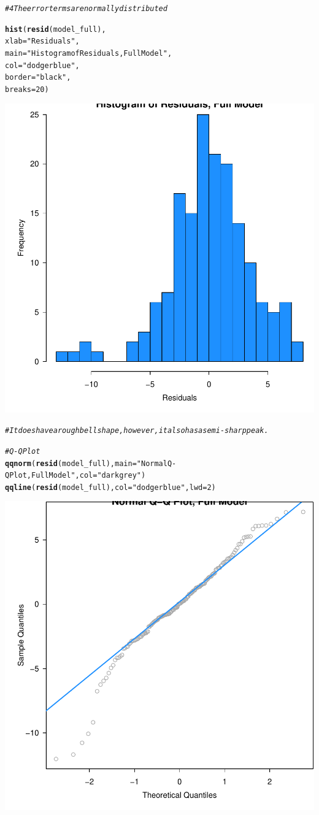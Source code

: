 \documentclass{article}\usepackage[]{graphicx}\usepackage[]{color}
\makeatletter
\newcommand{\hlnum}[1]{\textcolor[rgb]{0.686,0.059,0.569}{#1}}%
\newcommand{\hlstr}[1]{\textcolor[rgb]{0.192,0.494,0.8}{#1}}%
\newcommand{\hlcom}[1]{\textcolor[rgb]{0.678,0.584,0.686}{\textit{#1}}}%
\newcommand{\hlstd}[1]{\textcolor[rgb]{0.345,0.345,0.345}{#1}}%
\newcommand{\hlkwc}[1]{\textcolor[rgb]{0.333,0.667,0.333}{#1}}%
\newcommand{\hlkwd}[1]{\textcolor[rgb]{0.737,0.353,0.396}{\textbf{#1}}}%
\newenvironment{kframe}{%
 \def\at@end@of@kframe{}%
 \ifinner\ifhmode%
  \def\at@end@of@kframe{\end{minipage}}%
  \begin{minipage}{\columnwidth}%
 \fi\fi%
 \def\FrameCommand##1{\hskip\@totalleftmargin \hskip-\fboxsep
 \colorbox{shadecolor}{##1}\hskip-\fboxsep
     \hskip-\linewidth \hskip-\@totalleftmargin \hskip\columnwidth}%
 \MakeFramed {\advance\hsize-\width
   \@totalleftmargin\z@ \linewidth\hsize
   \@setminipage}}%
 {\par\unskip\endMakeFramed%
 \at@end@of@kframe}
\newenvironment{knitrout}{}{} %
\makeatother
\begin{document}
\begin{knitrout}
\begin{kframe}
\begin{alltt}
\hlcom{# 4 The error terms are normally distributed}

\hlkwd{hist}\hlstd{(}\hlkwd{resid}\hlstd{(model_full),}
     \hlkwc{xlab}   \hlstd{=} \hlstr{"Residuals"}\hlstd{,}
     \hlkwc{main}   \hlstd{=} \hlstr{"Histogram of Residuals, Full Model"}\hlstd{,}
     \hlkwc{col}    \hlstd{=} \hlstr{"dodgerblue"}\hlstd{,}
     \hlkwc{border} \hlstd{=} \hlstr{"black"}\hlstd{,}
     \hlkwc{breaks} \hlstd{=} \hlnum{20}\hlstd{)}
\end{alltt}
\end{kframe}

{\centering \includegraphics[width=.6\linewidth]{figure/Analysis-Rnwauto-report-21} 

}


\begin{kframe}\begin{alltt}
\hlcom{# It does have a rough bell shape, however, it also has a semi-sharp peak.}

\hlcom{# Q-Q Plot}
\hlkwd{qqnorm}\hlstd{(}\hlkwd{resid}\hlstd{(model_full),} \hlkwc{main} \hlstd{=} \hlstr{"Normal Q-Q Plot, Full Model"}\hlstd{,} \hlkwc{col} \hlstd{=} \hlstr{"darkgrey"}\hlstd{)}
\hlkwd{qqline}\hlstd{(}\hlkwd{resid}\hlstd{(model_full),} \hlkwc{col} \hlstd{=} \hlstr{"dodgerblue"}\hlstd{,} \hlkwc{lwd} \hlstd{=} \hlnum{2}\hlstd{)}
\end{alltt}
\end{kframe}

{\centering \includegraphics[width=.6\linewidth]{figure/Analysis-Rnwauto-report-22} 

}
\end{knitrout}
\end{document}
